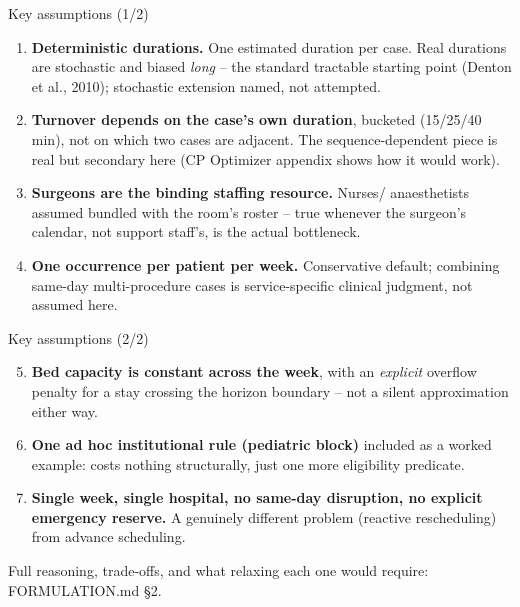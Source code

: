 \documentclass[aspectratio=169]{beamer}
\begin{document}
\begin{frame}{Key assumptions (1/2)}
  \small
  \begin{enumerate}
    \item \textbf{Deterministic durations.} One estimated duration per case.
      Real durations are stochastic and biased \emph{long} -- the standard
      tractable starting point (Denton et al., 2010); stochastic extension
      named, not attempted.
    \item \textbf{Turnover depends on the case's own duration}, bucketed
      (15/25/40 min), not on which two cases are adjacent. The
      sequence-dependent piece is real but secondary here (CP Optimizer
      appendix shows how it would work).
    \item \textbf{Surgeons are the binding staffing resource.} Nurses/
      anaesthetists assumed bundled with the room's roster -- true whenever
      the surgeon's calendar, not support staff's, is the actual
      bottleneck.
    \item \textbf{One occurrence per patient per week.} Conservative
      default; combining same-day multi-procedure cases is service-specific
      clinical judgment, not assumed here.
  \end{enumerate}
\end{frame}

\begin{frame}{Key assumptions (2/2)}
  \small
  \begin{enumerate}
    \setcounter{enumi}{4}
    \item \textbf{Bed capacity is constant across the week}, with an
      \emph{explicit} overflow penalty for a stay crossing the horizon
      boundary -- not a silent approximation either way.
    \item \textbf{One ad hoc institutional rule (pediatric block)} included
      as a worked example: costs nothing structurally, just one more
      eligibility predicate.
    \item \textbf{Single week, single hospital, no same-day disruption, no
      explicit emergency reserve.} A genuinely different problem
      (reactive rescheduling) from advance scheduling.
  \end{enumerate}
  \vspace{1em}
  \footnotesize Full reasoning, trade-offs, and what relaxing each one would
  require: FORMULATION.md \S2.
\end{frame}

\end{document}
